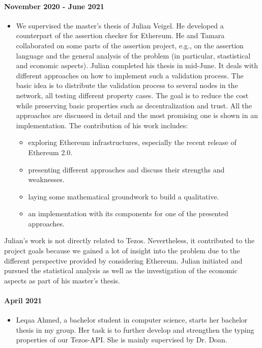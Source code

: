 \documentclass[a4paper,11pt]{article}
\begin{document}
\paragraph{November 2020 - June 2021}
\begin{itemize}
\item We supervised the master's thesis of Julian Veigel. He developed a counterpart of the assertion checker for Ethereum. He  and Tamara collaborated on some parts of the assertion project, e.g., on the assertion language and the general analysis of the problem (in particular, stastistical and economic aspects). Julian completed his thesis in mid-June. It deals with different approaches on how to implement such a validation process. The basic idea is to distribute the validation process to several nodes in the network, all testing different property cases. The goal is to reduce the cost while preserving basic properties such as decentralization and trust. All the approaches are discussed in detail and the most promising one is shown in an implementation. The contribution of his work includes:
\begin{itemize}
\item exploring Ethereum infrastructures, especially the recent release of Ethereum 2.0.
\item presenting different approaches and discuss their strengths and weaknesses.
\item laying some mathematical groundwork to build a qualitative.
\item an implementation with its components for one of the presented approaches.
\end{itemize}
\end{itemize}

Julian's work is not directly related to Tezos. Nevertheless, it contributed to the project goals because we gained a lot of insight into the problem due to the different perspective provided by considering Ethereum. Julian initiated and pursued the statistical analysis as well as the investigation of the economic aspects as part of his master's thesis.


\paragraph{April 2021}
\begin{itemize}
\item Leqaa Ahmed, a bachelor student in computer science, starts her bachelor thesis in my group. Her task is to further develop and strengthen the typing properties of our Tezos-API. She is mainly supervised by Dr. Doan.
\end{itemize}
\end{document}
